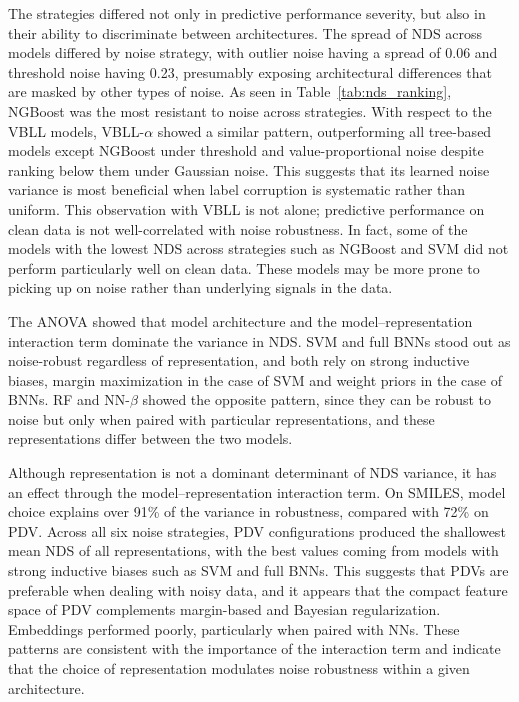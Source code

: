 The strategies differed not only in predictive performance severity, but also in their ability to discriminate between architectures. The spread of NDS across models differed by noise strategy, with outlier noise having a spread of 0.06 and threshold noise having 0.23, presumably exposing architectural differences that are masked by other types of noise. As seen in Table~\ref{tab:nds_ranking}, NGBoost was the most resistant to noise across strategies. With respect to the VBLL models, VBLL-$\alpha$ showed a similar pattern, outperforming all tree-based models except NGBoost under threshold and value-proportional noise despite ranking below them under Gaussian noise. This suggests that its learned noise variance is most beneficial when label corruption is systematic rather than uniform. This observation with VBLL is not alone; predictive performance on clean data is not well-correlated with noise robustness. In fact, some of the models with the lowest NDS across strategies such as NGBoost and SVM did not perform particularly well on clean data. These models may be more prone to picking up on noise rather than underlying signals in the data. 

The ANOVA showed that model architecture and the model--representation interaction term dominate the variance in NDS. SVM and full BNNs stood out as noise-robust regardless of representation, and both rely on strong inductive biases, margin maximization in the case of SVM and weight priors in the case of BNNs. RF and NN-$\beta$ showed the opposite pattern, since they can be robust to noise but only when paired with particular representations, and these representations differ between the two models.

Although representation is not a dominant determinant of NDS variance, it has an effect through the model--representation interaction term. On SMILES, model choice explains over 91\% of the variance in robustness, compared with 72\% on PDV. Across all six noise strategies, PDV configurations produced the shallowest mean NDS of all representations, with the best values coming from models with strong inductive biases such as SVM and full BNNs. This suggests that PDVs are preferable when dealing with noisy data, and it appears that the compact feature space of PDV complements margin-based and Bayesian regularization. Embeddings performed poorly, particularly when paired with NNs. These patterns are consistent with the importance of the interaction term and indicate that the choice of representation modulates noise robustness within a given architecture.

